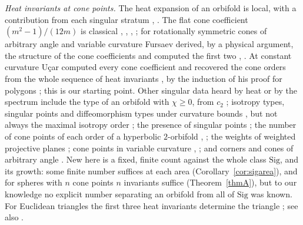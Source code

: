 \documentclass[pdflatex,sn-mathphys-num]{sn-jnl}
\theoremstyle{thmstyleone}%
\theoremstyle{thmstylethree}%
\newcommand{\Sig}{\mathrm{Sig}}
\begin{document}
\emph{Heat invariants at cone points.} The heat expansion of an orbifold is local, with a contribution from each singular stratum \cite{donnelly1979}, \cite[Thm~4.8]{dggw2008}. The flat cone coefficient $(m^2-1)/(12m)$ is classical \cite[(4.42)]{cheeger1983}, \cite[(6.4)]{bkd1996}, \cite{dowker1977,bruningseeley1987}, \cite[Rem.~6.6]{nrs2025}; for rotationally symmetric cones of arbitrary angle and variable curvature Fursaev derived, by a physical argument, the structure of the cone coefficients and computed the first two \cite[(3.26)--(3.28)]{fursaev1994}, \cite{dowker1994}. At constant curvature U\c{c}ar computed every cone coefficient and recovered the cone orders from the whole sequence of heat invariants \cite[Thm~4.20, Cors~4.21(iv), 4.23]{ucar2017}, by the induction of his proof for polygons \cite[Thm~3.40]{ucar2017}; this is our starting point. Other singular data heard by heat or by the spectrum include the type of an orbifold with $\chi\ge0$, from $c_2$ \cite[Thms~5.14--5.15]{dggw2008}; isotropy types, singular points and diffeomorphism types under curvature bounds \cite{stanhope2005,proctorstanhope2010}, but not always the maximal isotropy order \cite{rsw2008}; the presence of singular points \cite{gittins2024}; the number of cone points of each order of a hyperbolic $2$-orbifold \cite[Thm~1.1]{drydenstrohmaier2009}, \cite{doylerossetti2011}; the weights of weighted projective planes \cite{adfg2008}; cone points in variable curvature \cite[Thm~4.1]{schueth2019}, \cite{schueth2025,suleymanova2017}; and corners and cones of arbitrary angle \cite{nrs2019,nrs2025,akr2026}. New here is a fixed, finite count against the whole class $\Sig$, and its growth: some finite number suffices at each area (Corollary~\ref{cor:sigarea}), and for spheres with $n$ cone points $n$ invariants suffice (Theorem~\ref{thmA}), but to our knowledge no explicit number separating an orbifold from all of $\Sig$ was known. For Euclidean triangles the first three heat invariants determine the triangle \cite[Thm~1]{griesermaronna2013}; see also \cite[Thm~1]{changdeturck1989}.
\end{document}
